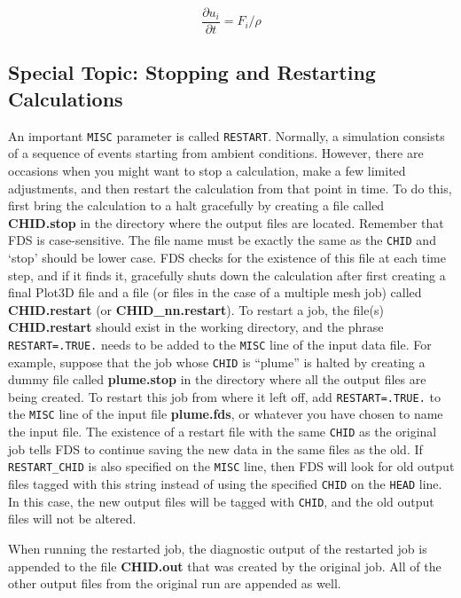 \documentclass[11pt]{book}
\newcommand{\ct}{\tt\small}
\begin{document}
\begin{equation}
\frac{\partial u_i}{\partial t} = F_i/\rho
\end{equation}

\subsection{Special Topic: Stopping and Restarting Calculations}
\label{info:restart}

An important {\ct MISC} parameter is called {\ct RESTART}. Normally, a simulation consists of a sequence of events
starting from ambient conditions. However, there are occasions
when you might want to stop a calculation, make a few
limited adjustments, and then
restart the calculation from that point in time. To do this,
first bring the calculation to a halt gracefully by creating a file
called {\bf CHID.stop}
in the directory where the output files are located. Remember that
FDS is case-sensitive. The file name must be exactly the same as
the {\ct CHID} and `stop' should be lower case. FDS checks for the
existence of this file at each time step, and if it finds it, gracefully
shuts down the calculation after first creating a final Plot3D
file and a file (or files in the case of a multiple mesh job)
called {\bf CHID.restart} (or {\bf CHID\_nn.restart}).
To restart a job, the file(s) {\bf CHID.restart} should exist in
the working directory, and
the phrase {\ct RESTART=.TRUE.} needs to be added
to the {\ct MISC} line of the input data file.
For example, suppose that the job
whose {\ct CHID} is ``plume'' is halted by creating a
dummy file called {\bf plume.stop} in the directory where
all the output files are being created. To restart this job from where it
left off, add {\ct RESTART=.TRUE.} to the {\ct MISC} line
of the input file {\bf plume.fds}, or whatever you have chosen to
name the input file. The existence of a restart file with the same
{\ct CHID} as the original job tells FDS
to continue saving the new data in the same files as the old.  If {\ct RESTART\_CHID} is also specified on the
{\ct MISC} line, then FDS will look for old output files tagged with this string instead of using the specified
{\ct CHID} on the {\ct HEAD} line. In this case, the new output files will be tagged with {\ct CHID}, and the
old output files will not be altered.

When running the restarted job, the diagnostic
output of the restarted job is appended to the file {\bf CHID.out} that was created by
the original job.
All of the other output files from the original run are appended as well.
\end{document}
